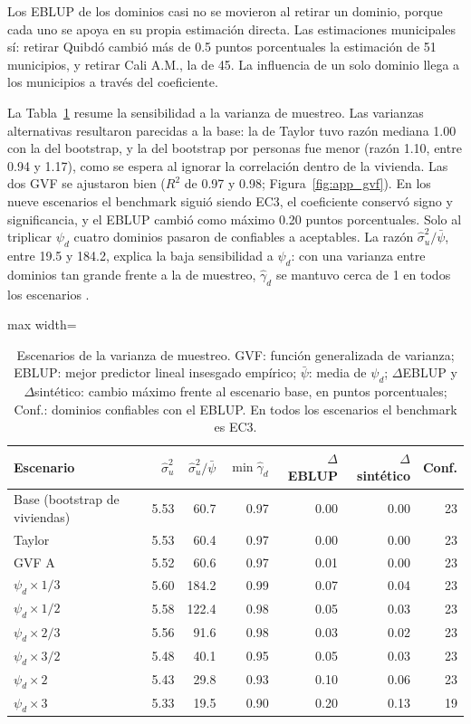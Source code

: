 Los EBLUP de los dominios casi no se movieron al retirar un dominio, porque cada uno se apoya en su propia estimación directa. Las estimaciones municipales sí: retirar Quibdó cambió más de 0.5 puntos porcentuales la estimación de 51 municipios, y retirar Cali A.M., la de 45. La influencia de un solo dominio llega a los municipios a través del coeficiente.

La Tabla~\ref{tab:res_varianza} resume la sensibilidad a la varianza de muestreo. Las varianzas alternativas resultaron parecidas a la base: la de Taylor tuvo razón mediana 1.00 con la del bootstrap, y la del bootstrap por personas fue menor (razón 1.10, entre 0.94 y 1.17), como se espera al ignorar la correlación dentro de la vivienda. Las dos GVF se ajustaron bien ($R^2$ de 0.97 y 0.98; Figura~\ref{fig:app_gvf}). En los nueve escenarios el benchmark siguió siendo EC3, el coeficiente conservó signo y significancia, y el EBLUP cambió como máximo 0.20 puntos porcentuales. Solo al triplicar $\psi_d$ cuatro dominios pasaron de confiables a aceptables. La razón $\hat{\sigma}_u^2/\bar{\psi}$, entre 19.5 y 184.2, explica la baja sensibilidad a $\psi_d$: con una varianza entre dominios tan grande frente a la de muestreo, $\hat{\gamma}_d$ se mantuvo cerca de 1 en todos los escenarios \cite[p.~143]{Benedetti2024}.

\begin{table}[!htbp]
\centering
\small
\caption{Escenarios de la varianza de muestreo. GVF: función generalizada de varianza; EBLUP: mejor predictor lineal insesgado empírico; $\bar{\psi}$: media de $\psi_d$; $\Delta$EBLUP y $\Delta$sintético: cambio máximo frente al escenario base, en puntos porcentuales; Conf.: dominios confiables con el EBLUP. En todos los escenarios el benchmark es EC3.}
\label{tab:res_varianza}
\begin{adjustbox}{max width=\linewidth}
\begin{tabular}{l r r r r r r}
\toprule
Escenario & $\hat{\sigma}_u^2$ & $\hat{\sigma}_u^2/\bar{\psi}$ & $\min \hat{\gamma}_d$ & $\Delta$EBLUP & $\Delta$sintético & Conf. \\
\midrule
Base (bootstrap de viviendas) & 5.53 & 60.7 & 0.97 & 0.00 & 0.00 & 23 \\
Taylor & 5.53 & 60.4 & 0.97 & 0.00 & 0.00 & 23 \\
GVF A & 5.52 & 60.6 & 0.97 & 0.01 & 0.00 & 23 \\
$\psi_d \times 1/3$ & 5.60 & 184.2 & 0.99 & 0.07 & 0.04 & 23 \\
$\psi_d \times 1/2$ & 5.58 & 122.4 & 0.98 & 0.05 & 0.03 & 23 \\
$\psi_d \times 2/3$ & 5.56 & 91.6 & 0.98 & 0.03 & 0.02 & 23 \\
$\psi_d \times 3/2$ & 5.48 & 40.1 & 0.95 & 0.05 & 0.03 & 23 \\
$\psi_d \times 2$ & 5.43 & 29.8 & 0.93 & 0.10 & 0.06 & 23 \\
$\psi_d \times 3$ & 5.33 & 19.5 & 0.90 & 0.20 & 0.13 & 19 \\
\bottomrule
\end{tabular}
\end{adjustbox}
\end{table}

